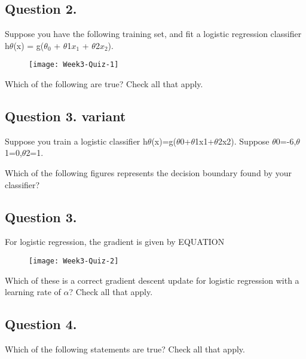 \documentclass[11pt]{article} %
\begin{document}

	
	\subsection*{Question 2. }
	Suppose you have the following training set, and fit a logistic regression classifier h$\theta$(x) = g($\theta_0$ + $\theta$1$x_1$ + $\theta$2$x_2$).
	
	\begin{figure}[h!]
\centering
\texttt{[image: Week3-Quiz-1]}

\end{figure}

	
	Which of the following are true? Check all that apply.
	
	\subsection{Question 3. variant
		}
	Suppose you train a logistic classifier h$\theta$(x)=g($\theta$0+$\theta$1x1+$\theta$2x2). 
	Suppose $\theta$0=-6,$\theta$1=0,$\theta$2=1. 
	
	Which of the following figures represents the decision boundary found by your classifier?
	
	\subsection*{Question 3. }
	For logistic regression, the gradient is given by EQUATION
	
	\begin{figure}[h!]
\centering
\texttt{[image: Week3-Quiz-2]}

\end{figure}

	Which of these is a correct gradient descent update for logistic regression with a learning rate of $\alpha$? Check all that apply.

	\subsection*{Question 4. }
	Which of the following statements are true? Check all that apply.
	
\end{document}
